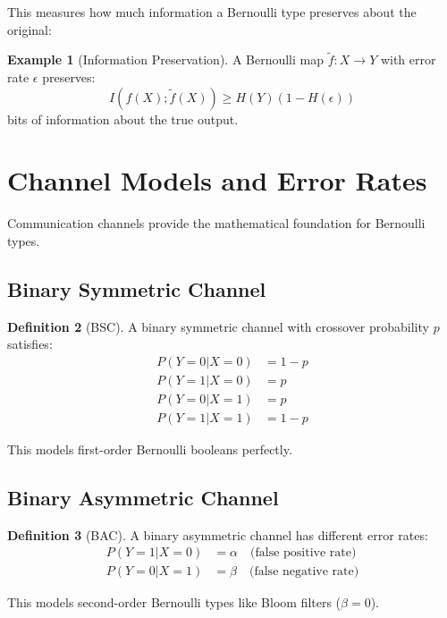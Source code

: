 \documentclass[11pt,twoside,openright]{book}
\theoremstyle{definition}
\newtheorem{definition}{Definition}[chapter]
\newtheorem{example}[definition]{Example}
\theoremstyle{plain}
\theoremstyle{remark}
\begin{document}
This measures how much information a Bernoulli type preserves about the original:

\begin{example}[Information Preservation]
A Bernoulli map $\tilde{f}: X \to Y$ with error rate $\epsilon$ preserves:
\begin{equation}
I(f(X); \tilde{f}(X)) \geq H(Y)(1 - H(\epsilon))
\end{equation}
bits of information about the true output.
\end{example}

\section{Channel Models and Error Rates}

Communication channels provide the mathematical foundation for Bernoulli types.

\subsection{Binary Symmetric Channel}

\begin{definition}[BSC]
A binary symmetric channel with crossover probability $p$ satisfies:
\begin{align}
P(Y = 0 | X = 0) &= 1 - p \\
P(Y = 1 | X = 0) &= p \\
P(Y = 0 | X = 1) &= p \\
P(Y = 1 | X = 1) &= 1 - p
\end{align}
\end{definition}

This models first-order Bernoulli booleans perfectly.

\subsection{Binary Asymmetric Channel}

\begin{definition}[BAC]
A binary asymmetric channel has different error rates:
\begin{align}
P(Y = 1 | X = 0) &= \alpha \quad \text{(false positive rate)} \\
P(Y = 0 | X = 1) &= \beta \quad \text{(false negative rate)}
\end{align}
\end{definition}

This models second-order Bernoulli types like Bloom filters ($\beta = 0$).
\end{document}
